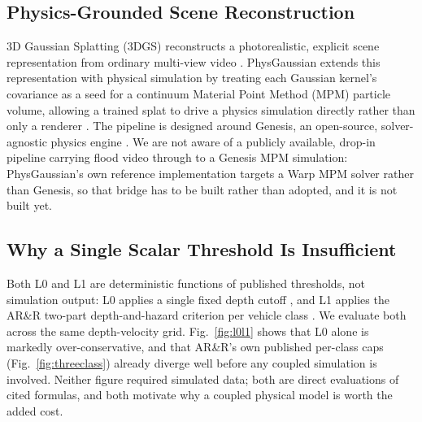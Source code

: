 \documentclass[conference]{IEEEtran}
\begin{document}
\subsection{Physics-Grounded Scene Reconstruction}
3D Gaussian Splatting (3DGS) reconstructs a photorealistic, explicit scene representation from ordinary multi-view video \cite{kerbl20233dgs}. PhysGaussian extends this representation with physical simulation by treating each Gaussian kernel's covariance as a seed for a continuum Material Point Method (MPM) particle volume, allowing a trained splat to drive a physics simulation directly rather than only a renderer \cite{xie2023physgaussian}. The pipeline is designed around Genesis, an open-source, solver-agnostic physics engine \cite{genesis2024}. We are not aware of a publicly available, drop-in pipeline carrying flood video through to a Genesis MPM simulation: PhysGaussian's own reference implementation targets a Warp MPM solver rather than Genesis, so that bridge has to be built rather than adopted, and it is not built yet.

\subsection{Why a Single Scalar Threshold Is Insufficient}
Both L0 and L1 are deterministic functions of published thresholds, not simulation output: L0 applies a single fixed depth cutoff \cite{nws_tadd}, and L1 applies the AR\&R two-part depth-and-hazard criterion per vehicle class \cite{shand2011arr}. We evaluate both across the same depth-velocity grid. Fig.~\ref{fig:l0l1} shows that L0 alone is markedly over-conservative, and that AR\&R's own published per-class caps (Fig.~\ref{fig:threeclass}) already diverge well before any coupled simulation is involved. Neither figure required simulated data; both are direct evaluations of cited formulas, and both motivate why a coupled physical model is worth the added cost.
\end{document}
